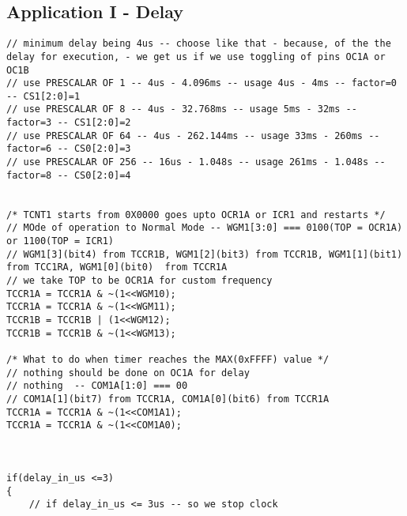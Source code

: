 \subsection{Application I - Delay}
\begin{verbatim}
// minimum delay being 4us -- choose like that - because, of the the delay for execution, - we get us if we use toggling of pins OC1A or OC1B
// use PRESCALAR OF 1 -- 4us - 4.096ms -- usage 4us - 4ms -- factor=0 -- CS1[2:0]=1
// use PRESCALAR OF 8 -- 4us - 32.768ms -- usage 5ms - 32ms -- factor=3 -- CS1[2:0]=2
// use PRESCALAR OF 64 -- 4us - 262.144ms -- usage 33ms - 260ms -- factor=6 -- CS0[2:0]=3
// use PRESCALAR OF 256 -- 16us - 1.048s -- usage 261ms - 1.048s -- factor=8 -- CS0[2:0]=4


/* TCNT1 starts from 0X0000 goes upto OCR1A or ICR1 and restarts */	
// MOde of operation to Normal Mode -- WGM1[3:0] === 0100(TOP = OCR1A) or 1100(TOP = ICR1)
// WGM1[3](bit4) from TCCR1B, WGM1[2](bit3) from TCCR1B, WGM1[1](bit1)  from TCC1RA, WGM1[0](bit0)  from TCCR1A	
// we take TOP to be OCR1A for custom frequency
TCCR1A = TCCR1A & ~(1<<WGM10);
TCCR1A = TCCR1A & ~(1<<WGM11);
TCCR1B = TCCR1B | (1<<WGM12);
TCCR1B = TCCR1B & ~(1<<WGM13);
    
/* What to do when timer reaches the MAX(0xFFFF) value */
// nothing should be done on OC1A for delay
// nothing  -- COM1A[1:0] === 00
// COM1A[1](bit7) from TCCR1A, COM1A[0](bit6) from TCCR1A
TCCR1A = TCCR1A & ~(1<<COM1A1);
TCCR1A = TCCR1A & ~(1<<COM1A0);



if(delay_in_us <=3)
{
    // if delay_in_us <= 3us -- so we stop clock
    

\end{verbatim}
